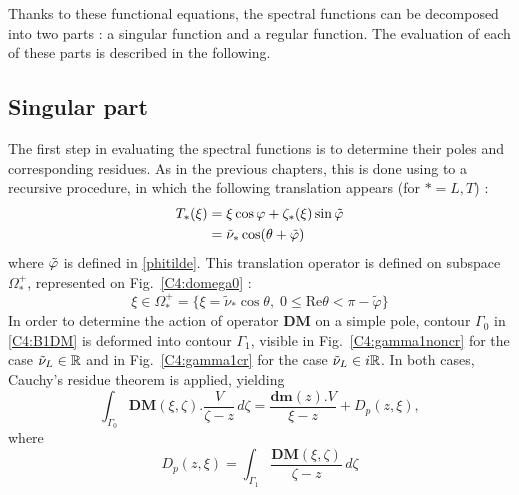 Thanks to these functional equations, the spectral functions can be decomposed into two parts : a singular function and a regular function. The evaluation of each of these parts is described in the following.

\subsection{Singular part}
\label{C4:singpart}
The first step in evaluating the spectral functions is to determine their poles and corresponding residues. As in the previous chapters, this is done using to a recursive procedure, in which the following translation appears (for $*=L,T$) :
\begin{equation}
\begin{split}
T_*(\xi)&=\xi \cos \varphi+\zeta_*(\xi)\sin \tilde{\varphi} \\
&=\tilde{\nu}_*\cos(\theta+\tilde{\varphi})
\end{split}
\end{equation}
where $\tilde{\varphi}$ is defined in \eqref{phitilde}. This translation operator is defined on subspace $\Omega_*^+$, represented on Fig.~\ref{C4:domega0} :
\begin{equation}
\xi \in \Omega_*^+= \{ \xi=\tilde{\nu}_* \cos \theta, \; 0 \leq \mbox{Re} \theta < \pi-\tilde{\varphi} \}
\label{C4:defOmega0}
\end{equation}
In order to determine the action of operator $\mathbf{DM}$ on a simple pole, contour $\Gamma_0$ in \eqref{C4:B1DM} is deformed into contour $\Gamma_1$, visible in Fig.~\ref{C4:gamma1noncr} for the case $\tilde{\nu}_L \in \mathbb{R}$ and in Fig.~\ref{C4:gamma1cr} for the case $\tilde{\nu}_L \in i\mathbb{R}$. In both cases, Cauchy's residue theorem is applied, yielding
\begin{equation}
\int_{\Gamma_0} \textbf{DM}(\xi,\zeta).\frac{V}{\zeta-z}\,d\zeta = \frac{\textbf{dm}(z).V}{\xi-z}+D_p(z,\xi),
\label{C4:GaussDM}
\end{equation}
where
\begin{equation}
D_p(z,\xi)= \int_{\Gamma_1} \frac{\textbf{DM}(\xi,\zeta)}{\zeta-z}\,d\zeta
\label{C4:defDp}
\end{equation}


